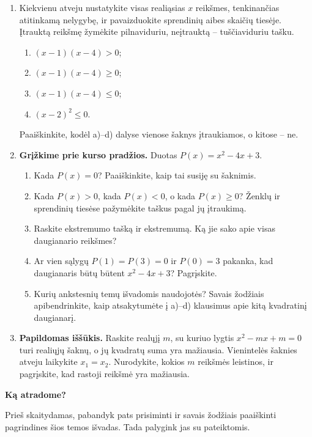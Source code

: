 \documentclass[12pt,a4paper]{article}
\begin{document}
\begin{enumerate}[series=uzdaviniai]
\item Kiekvienu atveju nustatykite visas realiąsias $x$ reikšmes, tenkinančias atitinkamą nelygybę, ir pavaizduokite sprendinių aibes skaičių tiesėje. Įtrauktą reikšmę žymėkite pilnaviduriu, neįtrauktą – tuščiaviduriu tašku.
\begin{enumerate}
\item $(x-1)(x-4)>0$; \item $(x-1)(x-4)\ge0$; \item $(x-1)(x-4)\le0$; \item $(x-2)^2\le0$.
\end{enumerate}
Paaiškinkite, kodėl a)–d) dalyse vienose šaknys įtraukiamos, o kitose – ne.
\item \textbf{Grįžkime prie kurso pradžios.} Duotas $P(x)=x^2-4x+3$.
\begin{enumerate}
\item Kada $P(x)=0$? Paaiškinkite, kaip tai susiję su šaknimis.
\item Kada $P(x)>0$, kada $P(x)<0$, o kada $P(x)\ge0$? Ženklų ir sprendinių tiesėse pažymėkite taškus pagal jų įtraukimą.
\item Raskite ekstremumo tašką ir ekstremumą. Ką jie sako apie visas daugianario reikšmes?
\item Ar vien sąlygų $P(1)=P(3)=0$ ir $P(0)=3$ pakanka, kad daugianaris būtų būtent $x^2-4x+3$? Pagrįskite.
\item Kurių ankstesnių temų išvadomis naudojotės? Savais žodžiais apibendrinkite, kaip atsakytumėte į a)–d) klausimus apie kitą kvadratinį daugianarį.
\end{enumerate}
\item \textbf{Papildomas iššūkis.} Raskite realųjį $m$, su kuriuo lygtis $x^2-mx+m=0$ turi realiųjų šaknų, o jų kvadratų suma yra mažiausia. Vienintelės šaknies atveju laikykite $x_1=x_2$. Nurodykite, kokios $m$ reikšmės leistinos, ir pagrįskite, kad rastoji reikšmė yra mažiausia.
\end{enumerate}
\newpage
\begin{center}{\Large\bfseries Ką atradome?}\end{center}
Prieš skaitydamas, pabandyk pats prisiminti ir savais žodžiais paaiškinti pagrindines šios temos išvadas. Tada palygink jas su pateiktomis.
\end{document}
